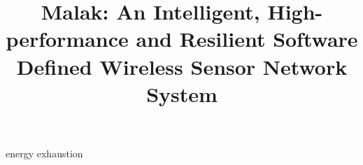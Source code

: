 \documentclass{sig-alternate}
\newcommand{\sdn}{Malak}
\begin{document}
\title{{\sdn}: An Intelligent, High-performance and Resilient Software Defined Wireless Sensor Network System}
\author{}

energy exhaustion


\maketitle





%






\end{document}
